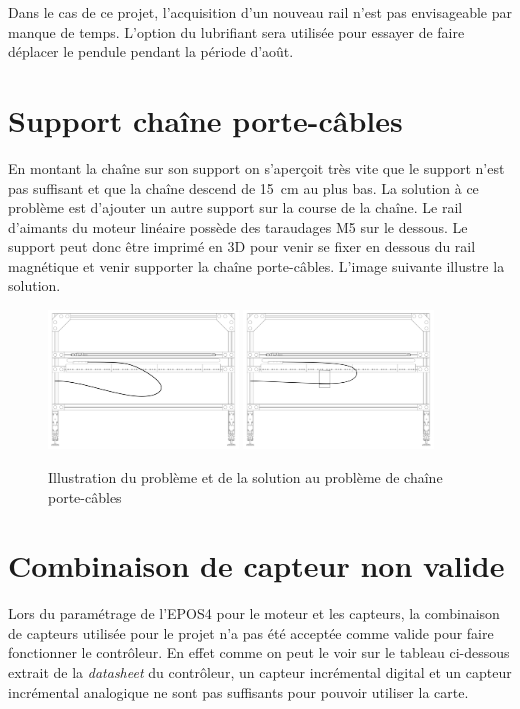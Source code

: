 Dans le cas de ce projet, l'acquisition d'un nouveau rail n'est pas envisageable par manque de temps. L'option du lubrifiant sera utilisée pour
essayer de faire déplacer le pendule pendant la période d'août.

\section{Support chaîne porte-câbles}\label{sec:ProbChaine}
En montant la chaîne sur son support on s'aperçoit très vite que le support n'est pas suffisant et que la chaîne descend de 15~cm au plus bas.
La solution à ce problème est d'ajouter un autre support sur la course de la chaîne. Le rail d'aimants du moteur linéaire possède des taraudages
M5 sur le dessous. Le support peut donc être imprimé en 3D pour venir se fixer en dessous du rail magnétique et venir supporter la chaîne porte-câbles.
L'image suivante illustre la solution.

\begin{figure}[H]
    \centering
    \includegraphics[width = 0.45\textwidth]{assets/figures/ProbChaine.svg}\hfill
    \includegraphics[width = 0.45\textwidth]{assets/figures/SolChaine.svg}
    \caption{Illustration du problème et de la solution au problème de chaîne porte-câbles}
    \label{fig:SolChaine}
\end{figure}

\section{Combinaison de capteur non valide}\label{sec:ProbCapt}
Lors du paramétrage de l'EPOS4 pour le moteur et les capteurs, la combinaison de capteurs utilisée pour le projet n'a pas été acceptée comme
valide pour faire fonctionner le contrôleur. En effet comme on peut le voir sur le tableau ci-dessous extrait de la \textit{datasheet} du contrôleur, un
capteur incrémental digital et un capteur incrémental analogique ne sont pas suffisants pour pouvoir utiliser la carte.


